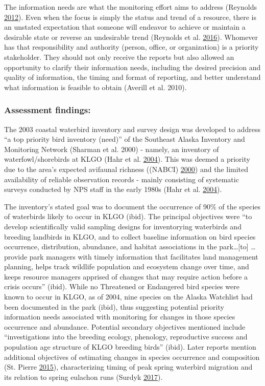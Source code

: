 \documentclass[]{article}
\begin{document}
The information needs are what the monitoring effort aims to address
(Reynolds \protect\hyperlink{ref-Reynolds2012}{2012}). Even when the
focus is simply the status and trend of a resource, there is an unstated
expectation that someone will endeavor to achieve or maintain a
desirable state or reverse an undesirable trend (Reynolds et al.
\protect\hyperlink{ref-Reynolds2016}{2016}). Whomever has that
responsibility and authority (person, office, or organization) is a
priority stakeholder. They should not only receive the reports but also
allowed an opportunity to clarify their information needs, including the
desired precision and quality of information, the timing and format of
reporting, and better understand what information is feasible to obtain
(Averill et al. 2010).

\subsubsection{Assessment findings:}\label{assessment-findings}

The 2003 coastal waterbird inventory and survey design was developed to
address ``a top priority bird inventory (need)'' of the Southeast Alaska
Inventory and Monitoring Network (Sharman et al. 2000) - namely, an
inventory of waterfowl/shorebirds at KLGO (Hahr et al.
\protect\hyperlink{ref-Hahr2004}{2004}). This was deemed a priority due
to the area's expected avifaunal richness ((NABCI)
\protect\hyperlink{ref-NABCI2000}{2000}) and the limited availability of
reliable observation records - mainly consisting of systematic surveys
conducted by NPS staff in the early 1980s (Hahr et al.
\protect\hyperlink{ref-Hahr2004}{2004}).

The inventory's stated goal was to document the occurrence of 90\% of
the species of waterbirds likely to occur in KLGO (ibid). The principal
objectives were ``to develop scientifically valid sampling designs for
inventorying waterbirds and breeding landbirds in KLGO, and to collect
baseline information on bird species occurrence, distribution,
abundance, and habitat associations in the park\ldots{}{[}to{]}
\ldots{}provide park managers with timely information that facilitates
land management planning, helps track wildlife population and ecosystem
change over time, and keeps resource managers apprised of changes that
may require action before a crisis occurs'' (ibid). While no Threatened
or Endangered bird species were known to occur in KLGO, as of 2004, nine
species on the Alaska Watchlist had been documented in the park (ibid),
thus suggesting potential priority information needs associated with
monitoring for changes in those species occurrence and abundance.
Potential secondary objectives mentioned include ``investigations into
the breeding ecology, phenology, reproductive success and population age
structure of KLGO breeding birds'' (ibid). Later reports mention
additional objectives of estimating changes in species occurrence and
composition (St. Pierre \protect\hyperlink{ref-St.Pierre2015}{2015}),
characterizing timing of peak spring waterbird migration and its
relation to spring eulachon runs (Surdyk
\protect\hyperlink{ref-Surdyk2017}{2017}).
\end{document}
